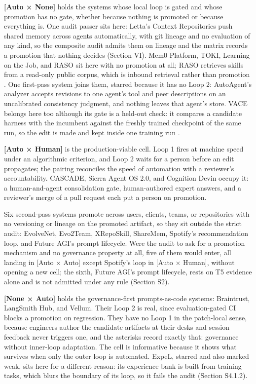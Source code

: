 \documentclass[
]{article}
\begin{document}
\textbf{{[}Auto × None{]}} holds the systems whose local loop is gated
and whose promotion has no gate, whether because nothing is promoted or
because everything is. One audit passer sits here: Letta's Context
Repositories push shared memory across agents automatically, with git
lineage and no evaluation of any kind, so the composite audit admits
them on lineage and the matrix records a promotion that nothing decides
(Section VI). Mem0 Platform, TOKI, Learning on the Job, and RASO sit
here with no promotion at all; RASO retrieves skills from a read-only
public corpus, which is inbound retrieval rather than promotion
\cite{chu2026raso}. One first-pass system joins them, starred because
it has no Loop 2: AutoAgent's analyzer accepts revisions to one agent's
tool and peer descriptions on an uncalibrated consistency judgment, and
nothing leaves that agent's store. VACE belongs here too although its
gate is a held-out check: it compares a candidate harness with the
incumbent against the freshly trained checkpoint of the same run, so the
edit is made and kept inside one training run \cite{qi2026vace}.

\textbf{{[}Auto × Human{]}} is the production-viable cell. Loop 1 fires
at machine speed under an algorithmic criterion, and Loop 2 waits for a
person before an edit propagates; the pairing reconciles the speed of
automation with a reviewer's accountability. CASCADE, Sierra Agent OS
2.0, and Cognition Devin occupy it: a human-and-agent consolidation
gate, human-authored expert answers, and a reviewer's merge of a pull
request each put a person on promotion.

Six second-pass systems promote across users, clients, teams, or
repositories with no versioning or lineage on the promoted artifact, so
they sit outside the strict audit: EvolveNet, Evo2Team, XRepoSkill,
ShareMem, Spotify's recommendation loop, and Future AGI's prompt
lifecycle. Were the audit to ask for a promotion mechanism and no
governance property at all, five of them would enter, all landing in
{[}Auto × Auto{]} except Spotify's loop in {[}Auto × Human{]}, without
opening a new cell; the sixth, Future AGI's prompt lifecycle, rests on
T5 evidence alone and is not admitted under any rule (Section S2).

\textbf{{[}None × Auto{]}} holds the governance-first prompts-as-code
systems: Braintrust, LangSmith Hub, and Vellum. Their Loop 2 is real,
since evaluation-gated CI blocks a promotion on regression. They have no
Loop 1 in the patch-local sense, because engineers author the candidate
artifacts at their desks and session feedback never triggers one, and
the asterisks record exactly that: governance without inner-loop
adaptation. The cell is informative because it shows what survives when
only the outer loop is automated. ExpeL, starred and also marked weak,
sits here for a different reason: its experience bank is built from
training tasks, which blurs the boundary of its loop, so it fails the
audit (Section S4.1.2).
\end{document}
